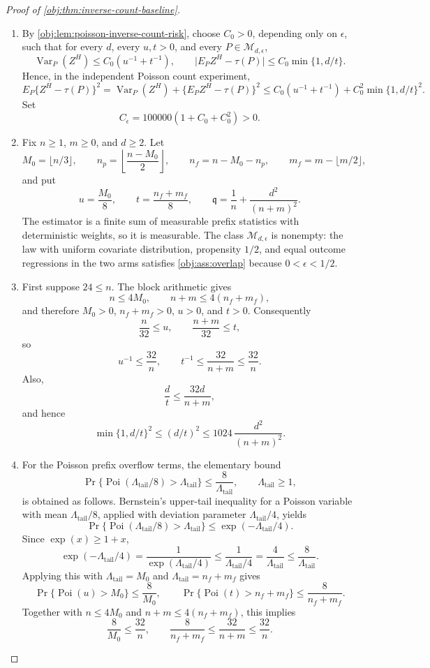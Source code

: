 \begin{proof}[Proof of \cref{obj:thm:inverse-count-baseline}]
\begin{enumerate}
\item By \cref{obj:lem:poisson-inverse-count-risk}, choose \(C_0>0\), depending only on \(\epsilon\), such that for every \(d\), every \(u,t>0\), and every \(P\in\mathcal M_{d,\epsilon}\),
\[
\operatorname{Var}_P(Z^H)\le C_0(u^{-1}+t^{-1}),
\qquad
\bigl|E_P Z^H-\tau(P)\bigr|\le C_0\min\{1,d/t\}.
\]
Hence, in the independent Poisson count experiment,
\[
E_P\{Z^H-\tau(P)\}^2
=
\operatorname{Var}_P(Z^H)+\{E_PZ^H-\tau(P)\}^2
\le
C_0(u^{-1}+t^{-1})
+
C_0^2\min\{1,d/t\}^2 .
\]
Set
\[
C_\epsilon=100000(1+C_0+C_0^2)>0 .
\]

\item Fix \(n\ge1\), \(m\ge0\), and \(d\ge2\).  Let
\[
M_0=\lfloor n/3\rfloor,\qquad
n_p=\left\lfloor\frac{n-M_0}{2}\right\rfloor,\qquad
n_f=n-M_0-n_p,\qquad
m_f=m-\lfloor m/2\rfloor ,
\]
and put
\[
u=\frac{M_0}{8},\qquad
t=\frac{n_f+m_f}{8},\qquad
\mathfrak q=\frac1n+\frac{d^2}{(n+m)^2}.
\]
The estimator is a finite sum of measurable prefix statistics with deterministic weights, so it is measurable.  The class \(\mathcal M_{d,\epsilon}\) is nonempty: the law with uniform covariate distribution, propensity \(1/2\), and equal outcome regressions in the two arms satisfies \cref{obj:ass:overlap} because \(0<\epsilon<1/2\). %

\item First suppose \(24\le n\).  The block arithmetic gives
\[
n\le4M_0,\qquad n+m\le4(n_f+m_f),
\]
and therefore \(M_0>0\), \(n_f+m_f>0\), \(u>0\), and \(t>0\).  Consequently
\[
\frac n{32}\le u,\qquad
\frac{n+m}{32}\le t,
\]
so
\[
u^{-1}\le\frac{32}{n},
\qquad
t^{-1}\le\frac{32}{n+m}\le\frac{32}{n}.
\]
Also,
\[
\frac dt\le \frac{32d}{n+m},
\]
and hence
\[
\min\{1,d/t\}^2
\le (d/t)^2
\le
1024\,\frac{d^2}{(n+m)^2}.
\]

\item For the Poisson prefix overflow terms, the elementary bound
\[
\Pr\{\operatorname{Poi}(\Lambda_{\mathrm{tail}}/8)>\Lambda_{\mathrm{tail}}\}
\le \frac8{\Lambda_{\mathrm{tail}}},\qquad \Lambda_{\mathrm{tail}}\ge1,
\]
is obtained as follows.  Bernstein's upper-tail inequality for a Poisson variable with mean \(\Lambda_{\mathrm{tail}}/8\), applied with deviation parameter \(\Lambda_{\mathrm{tail}}/4\), yields
\[
\Pr\{\operatorname{Poi}(\Lambda_{\mathrm{tail}}/8)>\Lambda_{\mathrm{tail}}\}
\le \exp(-\Lambda_{\mathrm{tail}}/4).
\]
Since \(\exp(x)\ge 1+x\),
\[
\exp(-\Lambda_{\mathrm{tail}}/4)=\frac1{\exp(\Lambda_{\mathrm{tail}}/4)}
\le \frac1{\Lambda_{\mathrm{tail}}/4}
=\frac4{\Lambda_{\mathrm{tail}}}
\le\frac8{\Lambda_{\mathrm{tail}}} .
\]
Applying this with \(\Lambda_{\mathrm{tail}}=M_0\) and \(\Lambda_{\mathrm{tail}}=n_f+m_f\) gives
\[
\Pr\{\operatorname{Poi}(u)>M_0\}\le \frac8{M_0},
\qquad
\Pr\{\operatorname{Poi}(t)>n_f+m_f\}\le \frac8{n_f+m_f}.
\]
Together with \(n\le4M_0\) and \(n+m\le4(n_f+m_f)\), this implies
\[
\frac8{M_0}\le \frac{32}{n},
\qquad
\frac8{n_f+m_f}\le \frac{32}{n+m}\le \frac{32}{n}.
\]


\end{enumerate}
\end{proof}

